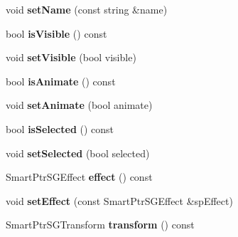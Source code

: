 \begin{DoxyCompactItemize}
\item 
\hypertarget{classps_1_1scene_1_1SGNode_a663dff07124b0ab20870a33b4c393e6e}{}void {\bfseries set\+Name} (const string \&name)\label{classps_1_1scene_1_1SGNode_a663dff07124b0ab20870a33b4c393e6e}

\item 
\hypertarget{classps_1_1scene_1_1SGNode_a313af13aad934c6f61c05c0cc76f0514}{}bool {\bfseries is\+Visible} () const \label{classps_1_1scene_1_1SGNode_a313af13aad934c6f61c05c0cc76f0514}

\item 
\hypertarget{classps_1_1scene_1_1SGNode_a729e7c8652b68af6a1daa9bc7c49461c}{}void {\bfseries set\+Visible} (bool visible)\label{classps_1_1scene_1_1SGNode_a729e7c8652b68af6a1daa9bc7c49461c}

\item 
\hypertarget{classps_1_1scene_1_1SGNode_ad887fe4547b56e8a18664e6755ee6460}{}bool {\bfseries is\+Animate} () const \label{classps_1_1scene_1_1SGNode_ad887fe4547b56e8a18664e6755ee6460}

\item 
\hypertarget{classps_1_1scene_1_1SGNode_ab7556b1a929ec8430af765570df35b86}{}void {\bfseries set\+Animate} (bool animate)\label{classps_1_1scene_1_1SGNode_ab7556b1a929ec8430af765570df35b86}

\item 
\hypertarget{classps_1_1scene_1_1SGNode_a90d373c716ad744b3314741383df156d}{}bool {\bfseries is\+Selected} () const \label{classps_1_1scene_1_1SGNode_a90d373c716ad744b3314741383df156d}

\item 
\hypertarget{classps_1_1scene_1_1SGNode_a646ecc45f3317fcb8327f4d6879f00d4}{}void {\bfseries set\+Selected} (bool selected)\label{classps_1_1scene_1_1SGNode_a646ecc45f3317fcb8327f4d6879f00d4}

\item 
\hypertarget{classps_1_1scene_1_1SGNode_a37b24105ff1343f7bd4a3cbf803dd06e}{}Smart\+Ptr\+S\+G\+Effect {\bfseries effect} () const \label{classps_1_1scene_1_1SGNode_a37b24105ff1343f7bd4a3cbf803dd06e}

\item 
\hypertarget{classps_1_1scene_1_1SGNode_a68ca301dfa5ab6d390ca462fbba605e8}{}void {\bfseries set\+Effect} (const Smart\+Ptr\+S\+G\+Effect \&sp\+Effect)\label{classps_1_1scene_1_1SGNode_a68ca301dfa5ab6d390ca462fbba605e8}

\item 
\hypertarget{classps_1_1scene_1_1SGNode_ab0423fcc76b2dd09bb63c841961660b2}{}Smart\+Ptr\+S\+G\+Transform {\bfseries transform} () const \label{classps_1_1scene_1_1SGNode_ab0423fcc76b2dd09bb63c841961660b2}


\end{DoxyCompactItemize}

